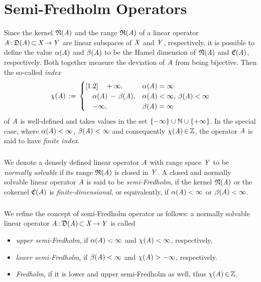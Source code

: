 \documentclass[11pt,twoside]{article}
\begin{document}
\section{Semi-Fredholm Operators}
Since the kernel $\mathfrak{N}(\mathit{A})$ and the range $\mathfrak{R}(\mathit{A})$
of a linear operator $\mathit{A} {\,:\,} \mathfrak{D}(\mathit{A}) {\,\subset\,} \mathit{X} {\,\to\,} \mathit{Y}$
are linear subspaces of $\mathit{X}$ and $\mathit{Y}$,
respectively,
it is possible to define the value $\alpha(\mathit{A})$ and $\beta(\mathit{A})$
to be the Hamel dimension
of $\mathfrak{N}(\mathit{A})$ and $\mathfrak{C}{(\mathit{A})}$,
respectively.
Both together measure the deviation of $\mathit{A}$ from being bijective.
Then the so-called \textit{index}
\[
\chi(\mathit{A}) \,:=\,
\begin{cases}[1.2]
\quad + \infty, & \alpha(\mathit{A}) = \infty\\
\quad \alpha(\mathit{A}) \, - \, \beta(\mathit{A}), &
\alpha(\mathit{A}) < \infty, \, \beta(\mathit{A}) < \infty\\
\quad - \infty, & \beta(\mathit{A}) = \infty\\
\end{cases}
\]
of $\mathit{A}$ is well-defined and takes values in the set
$\{- \infty\} \cup {\mathbb{N}} \cup \{+ \infty\}$.
In the special case,
where $\alpha(\mathit{A}) < \infty$, 
$\beta(\mathit{A}) < \infty$
and consequently $\chi(\mathit{A}) {\,\in\,} {\mathbb{Z}}$,
the operator $\mathit{A}$ is said to have \textit{finite index}.

\subparagraph*{}
We denote a densely defined linear operator $\mathit{A}$ with range space $\mathit{Y}$
to be \textit{normally solvable}
if its range $\mathfrak{R}(\mathit{A})$ is closed in $\mathit{Y}$.
A closed and normally solvable linear operator $\mathit{A}$
is said to be \textit{semi-Fredholm},
if the kernel $\mathfrak{N}(\mathit{A}) $ 
or the cokernel $\mathfrak{C}{(\mathit{A})} $ is \textit{finite-dimensional},
or equivalently,
if $\alpha(\mathit{A}) < \infty$ or $\beta(\mathit{A}) < \infty$.

\subparagraph*{}
We refine the concept of semi-Fredholm operator as follows:
a normally solvable linear operator
$\mathit{A} {\,:\,} \mathfrak{D}(\mathit{A}) {\,\subset\,} \mathit{X} {\,\to\,} \mathit{Y}$ is called

\begin{itemize}[leftmargin=12pt]
\item[1.]
\textit{upper semi-Fredholm},
if $\alpha(\mathit{A}) < \infty$ and $\chi(\mathit{A}) < \infty$, respectively,

\item[2.]
\textit{lower semi-Fredholm},
if $\beta(\mathit{A}) < \infty$ and $\chi(\mathit{A}) > - \infty$, respectively.

\item[3.]
\textit{Fredholm},
if it is lower and upper semi-Fredholm as well, thus $\chi(\mathit{A}) {\,\in\,} {\mathbb{Z}}$.
\end{itemize}
\end{document}
